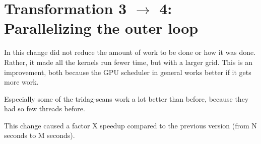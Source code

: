 \section{Transformation 3 $\rightarrow$ 4: Parallelizing the outer loop}

In this change did not reduce the amount of work to be done or how it
was done. Rather, it made all the kernels run fewer time, but with a
larger grid. This is an improvement, both because the GPU scheduler
in general works better if it gets more work.

Especially some of the tridag-scans work a lot better than before,
because they had so few threads before.

This change caused a factor X speedup compared to the previous version
(from N seconds to M seconds).

